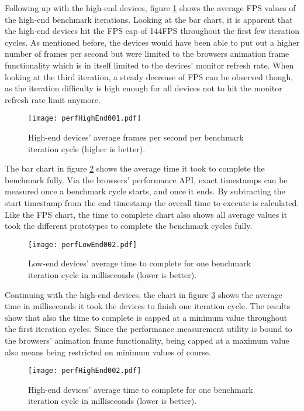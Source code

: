 Following up with the high-end devices, figure \ref{fig:perfHighEnd001} shows the average FPS values of the high-end benchmark iterations. Looking at the bar chart, it is apparent that the high-end devices hit the FPS cap of 144FPS throughout the first few iteration cycles. As mentioned before, the devices would have been able to put out a higher number of frames per second but were limited to the browsers animation frame functionality which is in itself limited to the devices' monitor refresh rate. When looking at the third iteration, a steady decrease of FPS can be observed though, as the iteration difficulty is high enough for all devices not to hit the monitor refresh rate limit anymore.

\begin{figure}
\centering
\texttt{[image: perfHighEnd001.pdf]}
\caption{High-end devices' average frames per second per benchmark iteration cycle (higher is better).}
\label{fig:perfHighEnd001}
\end{figure}

The bar chart in figure \ref{fig:perfLowEnd002} shows the average time it took to complete the benchmark fully. Via the browsers' performance API, exact timestamps can be measured once a benchmark cycle starts, and once it ends. By subtracting the start timestamp from the end timestamp the overall time to execute is calculated. Like the FPS chart, the time to complete chart also shows all average values it took the different prototypes to complete the benchmark cycles fully.

\begin{figure}
\centering
\texttt{[image: perfLowEnd002.pdf]}
\caption{Low-end devices' average time to complete for one benchmark iteration cycle in milliseconds (lower is better).}
\label{fig:perfLowEnd002}
\end{figure}

Continuing with the high-end devices, the chart in figure \ref{fig:perfHighEnd002} shows the average time in milliseconds it took the devices to finish one iteration cycle. The results show that also the time to complete is capped at a minimum value throughout the first iteration cycles. Since the performance measurement utility is bound to the browsers' animation frame functionality, being capped at a maximum value also means being restricted on minimum values of course.

\begin{figure}
\centering
\texttt{[image: perfHighEnd002.pdf]}
\caption{High-end devices' average time to complete for one benchmark iteration cycle in milliseconds (lower is better).}
\label{fig:perfHighEnd002}
\end{figure}


